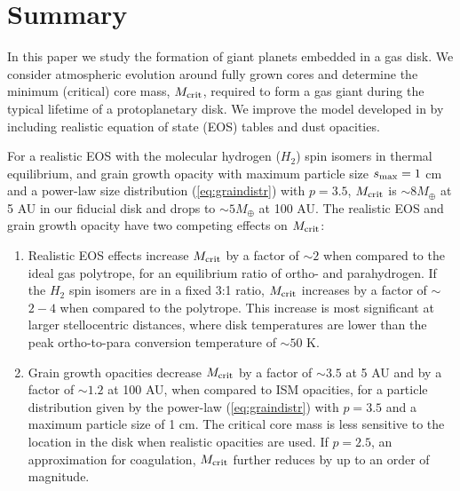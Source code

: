  \section{Summary}
 \label{conclusions}
 

 
 In this paper we study the formation of giant planets embedded in a gas disk. We consider atmospheric evolution around fully grown cores and determine the minimum (critical) core mass, $M_{\rm crit}$, required to form a gas giant during the typical lifetime of a protoplanetary disk. We improve the model developed in  \citet[hereafter Paper I]{piso14} by including realistic equation of state (EOS) tables and dust opacities. 
 
 For a realistic EOS with the molecular hydrogen ($H_2$) spin isomers in thermal equilibrium, and grain growth opacity with maximum particle size $s_{\rm max}=1$ cm and a power-law size distribution (\ref{eq:graindistr}) with $p=3.5$, $M_{\rm crit}$ is $\sim$$8 M_{\oplus}$ at 5 AU in our fiducial disk and drops to $\sim$$5 M_{\oplus}$ at 100 AU. The realistic EOS and grain growth opacity have two competing effects on $M_{\rm crit}$: 
 
 \begin{enumerate}
 \item Realistic EOS effects increase $M_{\rm crit}$ by a factor of $\sim$$2$ when compared to the ideal gas polytrope, for an equilibrium ratio of ortho- and parahydrogen. If the $H_2$ spin isomers are in a fixed 3:1 ratio, $M_{\rm crit}$ increases by a factor of $\sim$$2-4$ when compared to the polytrope. This increase is most significant at larger stellocentric distances, where disk temperatures are lower than the peak ortho-to-para conversion temperature of $\sim$$50$ K.
  
 \item Grain growth opacities decrease $M_{\rm crit}$ by a factor of $\sim$$3.5$ at 5 AU and by a factor of $\sim$$1.2$ at 100 AU, when compared to ISM opacities, for a particle distribution given by the power-law (\ref{eq:graindistr}) with $p=3.5$ and a maximum particle size of 1 cm. The critical core mass is less sensitive to the location in the disk when realistic opacities are used. If $p=2.5$, an approximation for coagulation,  $M_{\rm crit}$ further reduces by up to an order of magnitude. 
 \end{enumerate}
 
